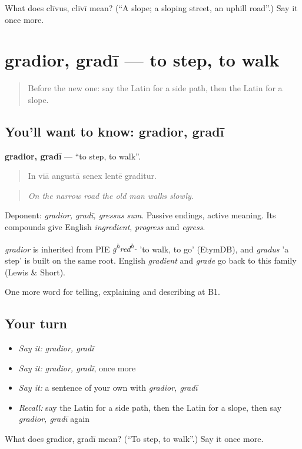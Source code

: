 \begin{tcolorbox}[breakable,colback=teal!4,colframe=teal!35!black,title={Before you move on}]
What does clīvus, clīvī mean? (\textquotedblleft{}A slope; a sloping street, an uphill road\textquotedblright{}.) Say it once more.
\end{tcolorbox}
\section[gradior, gradī]{gradior, gradī — to step, to walk}

\label{lesson:LA-C423-gradior}



\begin{quote}
Before the new one: say the Latin for a side path, then the Latin for a slope.
\end{quote}

\subsection*{You'll want to know: gradior, gradī}
\textbf{gradior, gradī} — \textquotedblleft{}to step, to walk\textquotedblright{}.

\begin{quote}
In viā angustā senex lentē graditur.
\end{quote}

\begin{quote}
\emph{On the narrow road the old man walks slowly.}
\end{quote}

Deponent: \emph{gradior, gradī, gressus sum}. Passive endings, active meaning. Its compounds give English \emph{ingredient}, \emph{progress} and \emph{egress}.

\begin{cousinweb}
\emph{gradior} is inherited from PIE \emph{g\textsuperscript{h}red\textsuperscript{h}-} 'to walk, to go' (EtymDB), and \emph{gradus} 'a step' is built on the same root. English \emph{gradient} and \emph{grade} go back to this family (Lewis \& Short).
\end{cousinweb}

\begin{grammarlens}[title={What you've built}]
One more word for telling, explaining and describing at B1.
\end{grammarlens}

\subsection*{Your turn}
\begin{itemize}
\raggedright
  \item \emph{Say it:} \emph{gradior, gradī}
  \item \emph{Say it:} \emph{gradior, gradī}, once more
  \item \emph{Say it:} a sentence of your own with \emph{gradior, gradī}
  \item \emph{Recall:} say the Latin for a side path, then the Latin for a slope, then say \emph{gradior, gradī} again
\end{itemize}

\begin{tcolorbox}[breakable,colback=teal!4,colframe=teal!35!black,title={Before you move on}]
What does gradior, gradī mean? (\textquotedblleft{}To step, to walk\textquotedblright{}.) Say it once more.
\end{tcolorbox}
